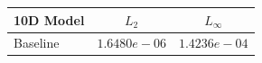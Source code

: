 \begin{table}[ht]
\centering
\begin{tabular}{lcc}
\hline
10D Model & $L_2$ & $L_\infty$ \\
\hline
Baseline & $1.6480e-06$ & $1.4236e-04$ \\
\hline
\end{tabular}
\end{table}
